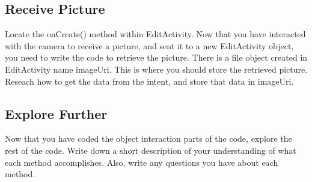 \subsection{Receive Picture}
Locate the onCreate() method within EditActivity. Now that you have interacted with the camera to receive a picture, and sent it to a new EditActivity object, you need to write the code to retrieve the picture. There is a file object created in EditActivity name imageUri. This is where you should store the retrieved picture. Reseach how to get the data from the intent, and store that data in imageUri.

\subsection{Explore Further}
Now that you have coded the object interaction parts of the code, explore the rest of the code. Write down a short description of your understanding of what each method accomplishes. Also, write any questions you have about each method.